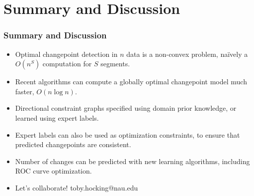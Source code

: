 \documentclass{beamer}
\begin{document}
\section{Summary and Discussion}

\begin{frame}[fragile]
  \frametitle{Summary and Discussion}

  \begin{itemize}
  \item Optimal changepoint detection in $n$ data is a non-convex
    problem, na\" ively a $O(n^S)$ computation for $S$ segments.
  \item Recent algorithms can compute a globally optimal changepoint
    model much faster, $O(n\log n)$.
  \item Directional constraint graphs specified using domain prior
    knowledge, or learned using expert labels.
  \item Expert labels can also be used as optimization constraints, to
    ensure that predicted changepoints are consistent.
  \item Number of changes can be predicted with new learning
    algorithms, including ROC curve optimization.
  \item Let's collaborate! toby.hocking@nau.edu
  \end{itemize}
  
\end{frame}
\end{document}
